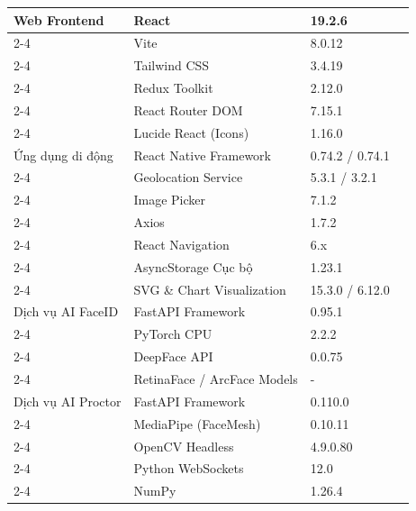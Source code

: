 \documentclass[../DoAn.tex]{subfiles}
\begin{document}
\begin{longtable}{|p{}|p{}|p{}|p{}|}
    Web Frontend & React & 19.2.6 & \cite{react_docs2026} \\ \cline{2-4}
    & Vite & 8.0.12 & \cite{vite_docs2026} \\ \cline{2-4}
    & Tailwind CSS & 3.4.19 & \cite{tailwindcss_docs2026} \\ \cline{2-4}
    & Redux Toolkit & 2.12.0 & \cite{redux_toolkit_docs} \\ \cline{2-4}
    & React Router DOM & 7.15.1 & \cite{react_router_docs} \\ \cline{2-4}
    & Lucide React (Icons) & 1.16.0 & \cite{lucide_docs2026} \\ \hline
    
    Ứng dụng di động & React Native Framework & 0.74.2 / 0.74.1 & \cite{react_native_docs2026} \\ \cline{2-4}
    & Geolocation Service & 5.3.1 / 3.2.1 & \cite{rn_geolocation_docs} \\ \cline{2-4}
    & Image Picker & 7.1.2 & \cite{rn_image_picker_docs} \\ \cline{2-4}
    & Axios & 1.7.2 & \cite{axios_docs} \\ \cline{2-4}
    & React Navigation & 6.x & \cite{react_navigation_docs} \\ \cline{2-4}
    & AsyncStorage Cục bộ & 1.23.1 & \cite{rn_async_storage_docs} \\ \cline{2-4}
    & SVG \& Chart Visualization & 15.3.0 / 6.12.0 & \cite{rn_chart_kit_docs} \\ \hline
    
    Dịch vụ AI FaceID & FastAPI Framework & 0.95.1 & \cite{fastapi_docs2026} \\ \cline{2-4}
    & PyTorch CPU & 2.2.2 & \cite{pytorch_docs} \\ \cline{2-4}
    & DeepFace API & 0.0.75 & \cite{deepface_github} \\ \cline{2-4}
    & RetinaFace / ArcFace Models & - & \cite{Deng_2020_CVPR, Deng_2019_CVPR} \\ \hline
    
    Dịch vụ AI Proctor & FastAPI Framework & 0.110.0 & \cite{fastapi_docs2026} \\ \cline{2-4}
    & MediaPipe (FaceMesh) & 0.10.11 & \cite{Lugaresi2019MediaPipe} \\ \cline{2-4}
    & OpenCV Headless & 4.9.0.80 & \cite{opencv_docs} \\ \cline{2-4}
    & Python WebSockets & 12.0 & \cite{fette2011websocket} \\ \cline{2-4}
    & NumPy & 1.26.4 & \cite{numpy_docs} \\ \hline
    

\end{longtable}
\end{document}
